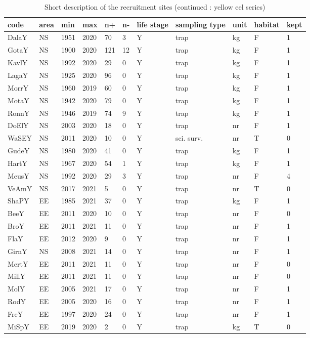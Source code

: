\begin{table}[htbp]
\centering
\caption{Short description of the recruitment sites (continued : yellow eel series) } 
\label{statseriesY}
\begin{tabular}{p{1cm}p{1cm}p{1cm}p{1cm}p{0.8cm}p{0.8cm}p{1cm}p{2cm}p{2cm}p{1cm}p{1cm}}
  \hline
code & area & min & max & n+ & n- & life stage & sampling type & unit & habitat & kept \\ 
  \hline
DalaY & NS & 1951 & 2020 & 70 & 3 & Y & trap & kg & F & 1 \\ 
  GotaY & NS & 1900 & 2020 & 121 & 12 & Y & trap & kg & F & 1 \\ 
  KavlY & NS & 1992 & 2020 & 29 & 0 & Y & trap & kg & F & 1 \\ 
  LagaY & NS & 1925 & 2020 & 96 & 0 & Y & trap & kg & F & 1 \\ 
  MorrY & NS & 1960 & 2019 & 60 & 0 & Y & trap & kg & F & 1 \\ 
  MotaY & NS & 1942 & 2020 & 79 & 0 & Y & trap & kg & F & 1 \\ 
  RonnY & NS & 1946 & 2019 & 74 & 9 & Y & trap & kg & F & 1 \\ 
  DoElY & NS & 2003 & 2020 & 18 & 0 & Y & trap & nr & F & 1 \\ 
  WaSEY & NS & 2011 & 2020 & 10 & 0 & Y & sci. surv. & nr & T & 0 \\ 
  GudeY & NS & 1980 & 2020 & 41 & 0 & Y & trap & kg & F & 1 \\ 
  HartY & NS & 1967 & 2020 & 54 & 1 & Y & trap & kg & F & 1 \\ 
  MeusY & NS & 1992 & 2020 & 29 & 3 & Y & trap & nr & F & 4 \\ 
  VeAmY & NS & 2017 & 2021 & 5 & 0 & Y & trap & nr & T & 0 \\ 
  ShaPY & EE & 1985 & 2021 & 37 & 0 & Y & trap & kg & F & 1 \\ 
  BeeY & EE & 2011 & 2020 & 10 & 0 & Y & trap & nr & F & 0 \\ 
  BroY & EE & 2011 & 2021 & 11 & 0 & Y & trap & nr & F & 1 \\ 
  FlaY & EE & 2012 & 2020 & 9 & 0 & Y & trap & nr & F & 1 \\ 
  GirnY & NS & 2008 & 2021 & 14 & 0 & Y & trap & nr & F & 1 \\ 
  MertY & EE & 2011 & 2021 & 11 & 0 & Y & trap & nr & F & 0 \\ 
  MillY & EE & 2011 & 2021 & 11 & 0 & Y & trap & nr & F & 0 \\ 
  MolY & EE & 2005 & 2021 & 17 & 0 & Y & trap & nr & F & 1 \\ 
  RodY & EE & 2005 & 2020 & 16 & 0 & Y & trap & nr & F & 1 \\ 
  FreY & EE & 1997 & 2020 & 24 & 0 & Y & trap & nr & F & 1 \\ 
  MiSpY & EE & 2019 & 2020 & 2 & 0 & Y & trap & kg & T & 0 \\ 
   \hline
\end{tabular}
\end{table}
